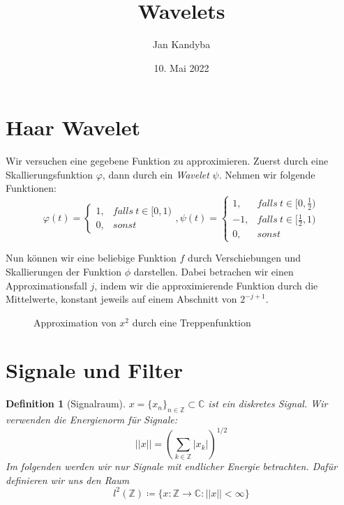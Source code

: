 \documentclass[]{scrartcl}
\title{Wavelets}
\author{Jan Kandyba}
\date{10. Mai 2022}
\theoremstyle{plain}
\newtheorem{defn}[theo]{Definition}
\theoremstyle{remark}
\begin{document}
    \maketitle

    \section{Haar Wavelet}

    Wir versuchen eine gegebene Funktion zu approximieren. Zuerst durch eine Skallierungsfunktion $\varphi$, dann durch ein \emph{Wavelet} $\psi$.
    Nehmen wir folgende Funktionen:
    $$\varphi(t) = 
    \begin{cases}
        1, &falls \: t \in [0, 1)\\
        0, &sonst    
    \end{cases},
    \psi(t) = 
    \begin{cases}
        1, &falls \: t \in [0, \frac{1}{2})\\
        -1, &falls \: t \in [\frac{1}{2}, 1) \\
        0, &sonst    
    \end{cases} 
    $$

    Nun können wir eine beliebige Funktion $f$ durch Verschiebungen und Skallierungen der Funktion $\phi$ darstellen. Dabei betrachen wir einen Approximationsfall $j$, indem wir die approximierende Funktion durch die Mittelwerte, konstant jeweils auf einem Abschnitt von $2^{-j+1}$.

    \begin{figure}
        \centering
        \caption{Approximation von $x^2$ durch eine Treppenfunktion}
    \end{figure}

    \section{Signale und Filter}

    \begin{defn}[Signalraum]
        $x = \{ x_n \}_{n \in \mathbb{Z}} \subset \mathbb{C}$ ist ein diskretes Signal.
        Wir verwenden die Energienorm für Signale:
        $$||x|| = (\sum_{k \in \mathbb{Z}} |x_k|)^{1/2}$$
        Im folgenden werden wir nur Signale mit endlicher Energie betrachten. Dafür definieren wir uns den Raum
        $$l^2(\mathbb{Z}) \coloneqq \{x: \mathbb{Z} \to \mathbb{C} : ||x|| < \infty\}$$
    \end{defn}
\end{document}
